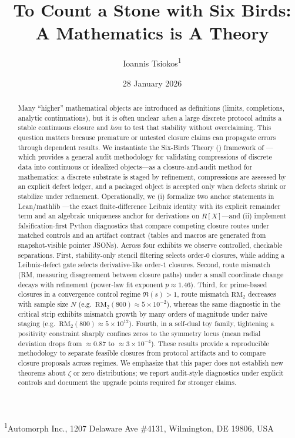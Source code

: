 \documentclass[11pt]{article}
\title{To Count a Stone with Six Birds: A Mathematics is A Theory}
\author{Ioannis Tsiokos\textsuperscript{1}}
\date{28 January 2026}
\newcommand{\printaffiliation}{%
  \begin{center}
    \small \textsuperscript{1}Automorph Inc., 1207 Delaware Ave \#4131, Wilmington, DE 19806, USA
  \end{center}
}
\begin{document}
\maketitle
\printaffiliation
\thispagestyle{firstpage}


\begin{abstract}
Many ``higher'' mathematical objects are introduced as definitions (limits, completions, analytic continuations), but it is often unclear \emph{when} a large discrete protocol admits a stable continuous closure and \emph{how} to test that stability without overclaiming. This question matters because premature or untested closure claims can propagate errors through dependent results. We instantiate the Six-Birds Theory (\SBT) framework of \cite{SixBirdsFramework}---which provides a general audit methodology for validating compressions of discrete data into continuous or idealized objects---as a closure-and-audit method for mathematics: a discrete substrate is staged by refinement, compressions are assessed by an explicit defect ledger, and a packaged object is accepted only when defects shrink or stabilize under refinement. Operationally, we (i) formalize two anchor statements in Lean/mathlib \cite{moura2021lean4,mathlib2020lean}---the exact finite-difference Leibniz identity with its explicit remainder term and an algebraic uniqueness anchor for derivations on $R[X]$---and (ii) implement falsification-first Python diagnostics that compare competing closure routes under matched controls and an artifact contract (tables and macros are generated from snapshot-visible pointer JSONs). Across four exhibits we observe controlled, checkable separations. First, stability-only stencil filtering selects order-$0$ closures, while adding a Leibniz-defect gate selects derivative-like order-$1$ closures. Second, route mismatch (RM, measuring disagreement between closure paths) under a small coordinate change decays with refinement (power-law fit exponent $p\approx 1.46$). Third, for prime-based closures in a convergence control regime $\Re(s)>1$, route mismatch $\mathrm{RM}_2$ decreases with sample size $N$ (e.g.\ $\mathrm{RM}_2(800)\approx 5\times 10^{-2}$), whereas the same diagnostic in the critical strip exhibits mismatch growth by many orders of magnitude under naive staging (e.g.\ $\mathrm{RM}_2(800)\approx 5\times 10^{12}$). Fourth, in a self-dual toy family, tightening a positivity constraint sharply confines zeros to the symmetry locus (mean radial deviation drops from $\approx 0.87$ to $\approx 3\times 10^{-4}$). These results provide a reproducible methodology to separate feasible closures from protocol artifacts and to compare closure proposals across regimes. We emphasize that this paper does not establish new theorems about $\zeta$ or zero distributions; we report audit-style diagnostics under explicit controls and document the upgrade points required for stronger claims.
\end{abstract}
\end{document}
